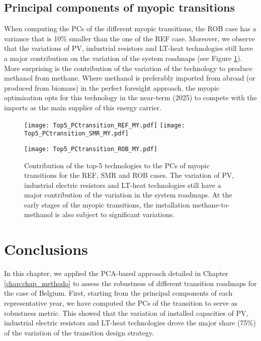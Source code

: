 \subsection{Principal components of myopic transitions}
\label{subsec:RobPol:PC_MY_transition}
When computing the \gls{PCs} of the different myopic transitions, the ROB case has a variance that is 10\% smaller than the one of the REF case. Moreover, we observe that the variations of \gls{PV}, industrial resistors and \gls{LT}-heat technologies still have a major contribution on the variation of the system roadmaps (see Figure \ref{fig:Top5_PCtransition_cases}). More surprising is the contribution of the variation of the technology to produce methanol from methane. Where methanol is preferably imported from abroad (or produced from biomass) in the perfect foresight approach, the myopic optimisation opts for this technology in the near-term (2025) to compete with the imports as the main supplier of this energy carrier.

\begin{figure}[!htbp]
\centering
\texttt{[image: Top5\_PCtransition\_REF\_MY.pdf]}
\texttt{[image: Top5\_PCtransition\_SMR\_MY.pdf]}
\end{figure}

\begin{figure}[!htbp]
\centering
\texttt{[image: Top5\_PCtransition\_ROB\_MY.pdf]}
\caption{Contribution of the top-5 technologies to the \gls{PCs} of myopic transitions for the REF, SMR and ROB cases. The variation of \gls{PV}, industrial electric resistors and \gls{LT}-heat technologies still have a major contribution of the variation in the system roadmaps. At the early stages of the myopic transitions, the installation methane-to-methanol is also subject to significant variations.}
\label{fig:Top5_PCtransition_cases}
\end{figure}


\section{Conclusions}
\label{sec:RobPol:Conclusions}
In this chapter, we applied the \gls{PCA}-based approach detailed in Chapter \ref{chap:chap_methodo} to assess the robustness of different transition roadmaps for the case of Belgium. First, starting from the principal components of each representative year, we have computed the PCs of the transition to serve as robustness metric. This showed that the variation of installed capacities of \gls{PV}, industrial electric resistors and \gls{LT}-heat technologies drove the major share (75\%) of the variation of the transition design strategy.  

